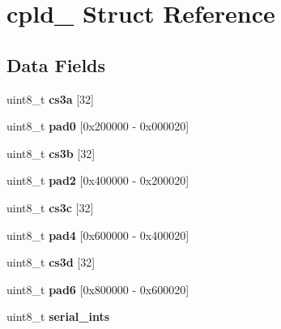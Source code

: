 \hypertarget{structcpld__}{}\section{cpld\+\_\+ Struct Reference}
\label{structcpld__}
\subsection*{Data Fields}
\begin{DoxyCompactItemize}
\item 
\mbox{\label{structcpld___a5a4c488dde3ec85a898886229cdf6f2d}} 
uint8\+\_\+t {\bfseries cs3a} \mbox{[}32\mbox{]}
\item 
\mbox{\label{structcpld___a192f589cdcfd50b85fd6e1f82de48d2b}} 
uint8\+\_\+t {\bfseries pad0} \mbox{[}0x200000 -\/ 0x000020\mbox{]}
\item 
\mbox{\label{structcpld___a341ac39f52e6bcf69dca5ad6e8f99682}} 
uint8\+\_\+t {\bfseries cs3b} \mbox{[}32\mbox{]}
\item 
\mbox{\label{structcpld___afc37a0c6652fe47b7430992ee0d70993}} 
uint8\+\_\+t {\bfseries pad2} \mbox{[}0x400000 -\/ 0x200020\mbox{]}
\item 
\mbox{\label{structcpld___a577c010d4c2cceee5c8e6e056782925a}} 
uint8\+\_\+t {\bfseries cs3c} \mbox{[}32\mbox{]}
\item 
\mbox{\label{structcpld___a3394328c0db22378d70ef89e0fde5ee1}} 
uint8\+\_\+t {\bfseries pad4} \mbox{[}0x600000 -\/ 0x400020\mbox{]}
\item 
\mbox{\label{structcpld___a7c0aa025135a23d97cf3f373eb7a3e90}} 
uint8\+\_\+t {\bfseries cs3d} \mbox{[}32\mbox{]}
\item 
\mbox{\label{structcpld___a05ad0bbbf37ea7e66a984ee797ba012a}} 
uint8\+\_\+t {\bfseries pad6} \mbox{[}0x800000 -\/ 0x600020\mbox{]}
\item 
\mbox{\label{structcpld___a8ec9714361eb70aa5255d29b7c223ad6}} 
uint8\+\_\+t {\bfseries serial\+\_\+ints}
\item 

\end{DoxyCompactItemize}

